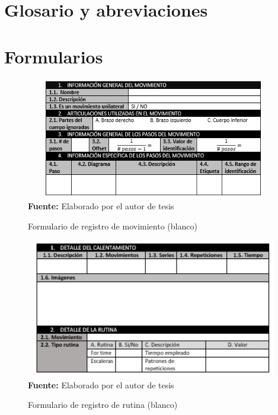 \appendix
\renewcommand{\thesection}{A.\arabic{section}}
\renewcommand{\thesubsection}{A.\arabic{section}.\arabic{subsection}}
\renewcommand{\thesubsubsection}{A.\arabic{section}.\arabic{subsection}.\arabic{subsubsection}}
\renewcommand\thefigure{A.\arabic{section}.\arabic{figure}}   
\renewcommand\thetable{A.\arabic{section}.\arabic{table}}  
\renewcommand\thecode{A.\arabic{section}.\arabic{code}}  
\appendixpage
\addappheadtotoc
\section{Glosario y abreviaciones}
\printglossary
\printglossary[type=\acronymtype, title=Abreviaciones]
\afterpage{\blankpage}
\newpage
\section{Formularios}
\begin{figure}[H]
	\caption{Formulario de  registro de movimiento (blanco)}
	\label{fig:frmWhiteMov}
	\centering
	\includegraphics[width=430px,height=200px]{graphics/frm-movimiento.PNG} \\
	\textbf{Fuente:} Elaborado por el autor de tesis
\end{figure}

\begin{figure}[H]
	\caption{Formulario de  registro de rutina (blanco)}
	\label{fig:frmWhiteRout}
	\centering
	\includegraphics[width=430px,height=230px]{graphics/frm-rutina.PNG} \\
	\textbf{Fuente:} Elaborado por el autor de tesis
\end{figure}
